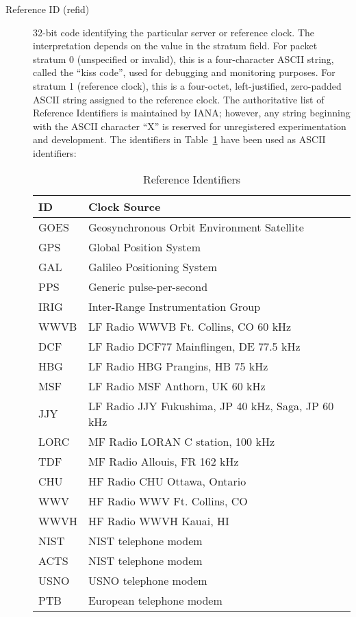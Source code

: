 \begin{description}
  \item[Reference ID (refid)] 32-bit code identifying the particular server
    or reference clock. The interpretation depends on the value in the
    stratum field. For packet stratum 0 (unspecified or invalid), this
    is a four-character ASCII \cite{RFC1345} string, called the ``kiss code'',
    used for debugging and monitoring purposes. For stratum 1 (reference
    clock), this is a four-octet, left-justified, zero-padded ASCII
    string assigned to the reference clock. The authoritative list of
    Reference Identifiers is maintained by IANA; however, any string
    beginning with the ASCII character ``X'' is reserved for unregistered
    experimentation and development. The identifiers in Table~\ref{reference_identifiers} have
    been used as ASCII identifiers:

    \begin{table}[htb]
      \center
      \begin{tabular}{| l | l |}
        \hline
        ID & Clock Source \\
        \hline
        \hline
        GOES & Geosynchronous Orbit Environment Satellite \\
        GPS & Global Position System \\
        GAL & Galileo Positioning System \\
        PPS & Generic pulse-per-second \\
        IRIG & Inter-Range Instrumentation Group \\
        WWVB & LF Radio WWVB Ft. Collins, CO 60 kHz \\
        DCF & LF Radio DCF77 Mainflingen, DE 77.5 kHz \\
        HBG & LF Radio HBG Prangins, HB 75 kHz \\
        MSF & LF Radio MSF Anthorn, UK 60 kHz \\
        JJY & LF Radio JJY Fukushima, JP 40 kHz, Saga, JP 60 kHz \\
        LORC & MF Radio LORAN C station, 100 kHz \\
        TDF & MF Radio Allouis, FR 162 kHz \\
        CHU & HF Radio CHU Ottawa, Ontario \\
        WWV & HF Radio WWV Ft. Collins, CO \\
        WWVH & HF Radio WWVH Kauai, HI \\
        NIST & NIST telephone modem \\
        ACTS & NIST telephone modem \\
        USNO & USNO telephone modem \\
        PTB & European telephone modem \\
        \hline
      \end{tabular}
      \caption{Reference Identifiers}
      \label{reference_identifiers}
    \end{table}


\end{description}
